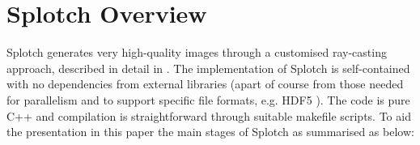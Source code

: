 \documentclass[1p]{elsarticle}
\begin{document}
\section{Splotch Overview}
\label{sec:overview}

Splotch generates very high-quality images through a customised ray-casting approach, described in detail in \cite{2008NJPh...10l5006D}.  
The implementation of Splotch is self-contained with no dependencies from external libraries (apart of course from those needed for parallelism and to support specific file formats, e.g. HDF5 \cite{hdf5}). The code is pure C++ and compilation is straightforward through suitable makefile scripts.
To aid the presentation in this paper the main stages of Splotch as summarised as below:
\end{document}
